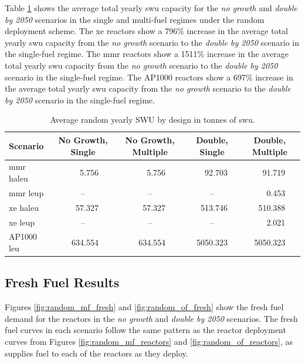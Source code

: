 Table \ref{tab:random_swu_avg} shows the average total yearly \gls{swu} capacity for the \textit{no growth} and \textit{double by 2050} scenarios in the single and multi-fuel regimes under the random deployment scheme. The \gls{xe} reactors show a 796\% increase in the average total yearly \gls{swu} capacity from the \textit{no growth} scenario to the \textit{double by 2050} scenario in the single-fuel regime. The \gls{mmr} reactors show a 1511\% increase in the average total yearly \gls{swu} capacity from the \textit{no growth} scenario to the \textit{double by 2050} scenario in the single-fuel regime. The AP1000 reactors show a 697\% increase in the average total yearly \gls{swu} capacity from the \textit{no growth} scenario to the \textit{double by 2050} scenario in the single-fuel regime.

\begin{table}[H]
    \centering
    \caption{Average random yearly SWU by design in tonnes of \gls{swu}.}
    \label{tab:random_swu_avg}
    \begin{tabular}{l c c c c}
       \hline
       Scenario & No Growth, Single & No Growth, Multiple & Double, Single & Double, Multiple  \\
       \hline
       \gls{mmr} \gls{haleu}   & \textcolor{white}{000}5.756   & \textcolor{white}{000}5.756   & \textcolor{white}{00}92.703    & \textcolor{white}{00}91.719   \\
       \gls{mmr} \gls{leup}    & --      & --      & --       & \textcolor{white}{000}0.453    \\
       \gls{xe} \gls{haleu}    & \textcolor{white}{00}57.327  & \textcolor{white}{00}57.327  & \textcolor{white}{0}513.746  & \textcolor{white}{0}510.388  \\
       \gls{xe} \gls{leup}     & --      & --      & --       & \textcolor{white}{000}2.021    \\
       AP1000 \gls{leu}        & \textcolor{white}{0}634.554 & \textcolor{white}{0}634.554 & 5050.323 & 5050.323 \\
       \hline
    \end{tabular}
\end{table}





\subsection{Fresh Fuel Results}
\label{sec:random_fresh}

Figures \ref{fig:random_mf_fresh} and \ref{fig:random_of_fresh} show the fresh fuel demand for the reactors in the \textit{no growth} and \textit{double by 2050} scenarios. The fresh fuel curves in each scenario follow the same pattern as the reactor deployment curves from Figures \ref{fig:random_mf_reactors} and \ref{fig:random_of_reactors}, as \cyclus supplies fuel to each of the reactors as they deploy.

